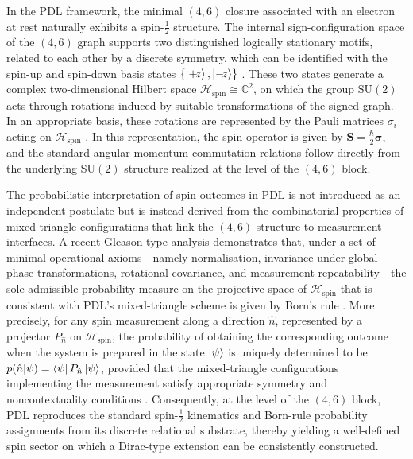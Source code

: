 \documentclass[11pt,a4paper]{article}
\theoremstyle{definition}
\newcommand{\Hspin}{\mathcal{H}_{\mathrm{spin}}}
\begin{document}
In the PDL framework, the minimal $(4,6)$ closure associated with an electron at rest naturally exhibits a spin-$\tfrac{1}{2}$ structure. The internal sign-configuration space of the $(4,6)$ graph supports two distinguished logically stationary motifs, related to each other by a discrete symmetry, which can be identified with the spin-up and spin-down basis states $\{\ket{+\!z},\ket{-\!z}\}$ \cite{PDL,PDL_introduction,PDL_Global_Mapping_Structures_Results_Open_Problems}. These two states generate a complex two-dimensional Hilbert space $\Hspin \cong \mathbb{C}^2$, on which the group $\mathrm{SU}(2)$ acts through rotations induced by suitable transformations of the signed graph. In an appropriate basis, these rotations are represented by the Pauli matrices $\sigma_i$ acting on $\Hspin$ \cite{Relational_Emergence_of_Born_s_Rule_and_a_Golden_Ratio_Active_Surface_in_PDL}. In this representation, the spin operator is given by $\mathbf{S} = \frac{\hbar}{2}\boldsymbol{\sigma}$, and the standard angular-momentum commutation relations follow directly from the underlying $\mathrm{SU}(2)$ structure realized at the level of the $(4,6)$ block.

The probabilistic interpretation of spin outcomes in PDL is not introduced as an independent postulate but is instead derived from the combinatorial properties of mixed-triangle configurations that link the $(4,6)$ structure to measurement interfaces. A recent Gleason-type analysis demonstrates that, under a set of minimal operational axioms—namely normalisation, invariance under global phase transformations, rotational covariance, and measurement repeatability—the sole admissible probability measure on the projective space of $\Hspin$ that is consistent with PDL’s mixed-triangle scheme is given by Born’s rule \cite{Toward_a_Gleason_Type_Uniqueness_Theorem_for_Born_s_Rule_in_the_PDL_Framework}. More precisely, for any spin measurement along a direction $\hat{n}$, represented by a projector $P_{\hat{n}}$ on $\Hspin$, the probability of obtaining the corresponding outcome when the system is prepared in the state $\ket{\psi}$ is uniquely determined to be $p(\hat{n}|\psi) = \bra{\psi}P_{\hat{n}}\ket{\psi}$, provided that the mixed-triangle configurations implementing the measurement satisfy appropriate symmetry and noncontextuality conditions \cite{Relational_Emergence_of_Born_s_Rule_and_a_Golden_Ratio_Active_Surface_in_PDL,Toward_a_Gleason_Type_Uniqueness_Theorem_for_Born_s_Rule_in_the_PDL_Framework}. Consequently, at the level of the $(4,6)$ block, PDL reproduces the standard spin-$\tfrac{1}{2}$ kinematics and Born-rule probability assignments from its discrete relational substrate, thereby yielding a well-defined spin sector on which a Dirac-type extension can be consistently constructed.
\end{document}
